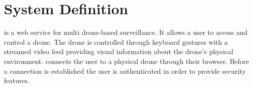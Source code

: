 \section{System Definition}
\projectname{} is a web service for multi drone-based surveillance. It allows a user to access and control a drone. The drone is controlled through keyboard gestures with a streamed video feed providing visual information about the drone's physical environment. \projectname{} connects the user to a physical drone through their browser. Before a connection is established the user is authenticated in order to provide security features.